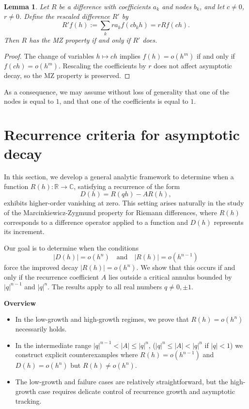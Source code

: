\documentclass{raex}
\newtheorem{lemma}[theorem]{Lemma}
\theoremstyle{definition}
\begin{document}
\begin{lemma}
Let \( R \) be a difference with coefficients \( a_k \) and nodes \( b_k \), and let \( c \neq 0 \), \( r \neq 0 \). Define the rescaled difference \( R' \) by
\[
R'f(h) := \sum_k r a_k f\left( cb_k h \right)=rRf(ch).
\]
Then \( R \) has the MZ property if and only if \( R' \) does.
\end{lemma}

\begin{proof}
The change of variables \( h \mapsto ch \) implies \( f(h) = o(h^m) \) if and only if \( f(ch) = o(h^m) \). Rescaling the coefficients by \( r \) does not affect asymptotic decay, so the MZ property is preserved.
\end{proof}

As a consequence, we may assume without loss of generality that one of the nodes is equal to \( 1 \), and that one of the coefficients is equal to \( 1 \).

\medskip


\section{Recurrence criteria for asymptotic decay}

In this section, we develop a general analytic framework to determine when a function \( R(h) \colon \mathbb{R} \to \mathbb{C} \), satisfying a recurrence of the form
\[
D(h) = R(qh) - A R(h),
\]
exhibits higher-order vanishing at zero. This setting arises naturally in the study of the Marcinkiewicz-Zygmund property for Riemann differences, where \( R(h) \) corresponds to a difference operator applied to a function and \( D(h) \) represents its increment.

Our goal is to determine when the conditions
\[
|D(h)| = o(h^n) \quad \text{and} \quad |R(h)| = o(h^{n-1})
\]
force the improved decay \( |R(h)| = o(h^n) \). We show that this occurs if and only if the recurrence coefficient \( A \) lies outside a critical annulus bounded by \( |q|^{n-1} \) and \( |q|^n \). The results apply to all real numbers \( q \neq 0, \pm 1 \).

\medskip
\noindent\textbf{Overview }
\begin{itemize}
    \item In the low-growth and high-growth regimes, we prove that \( R(h) = o(h^n) \) necessarily holds.
    \item In the intermediate range \( |q|^{n-1} < |A| \leq |q|^n \), ($|q|^n\leq |A|<|q|^n$ if $|q|<1$) we construct explicit counterexamples where \( R(h) = o(h^{n-1}) \) and \( D(h) = o(h^n) \) but \( R(h) \not= o(h^n) \).
    \item The low-growth and failure cases are relatively straightforward, but the high-growth case requires delicate control of recurrence growth and asymptotic tracking.
\end{itemize}
\end{document}
